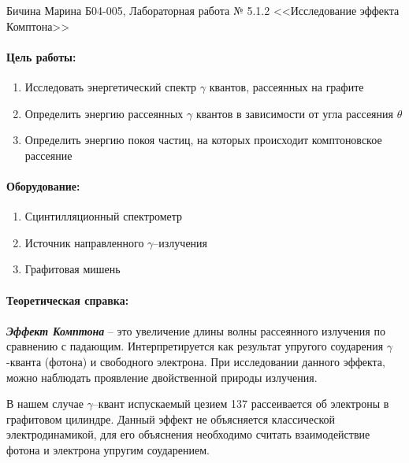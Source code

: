 \documentclass[a4paper,12pt]{article}
\author{Бичина Марина 
группа Б04-005 1 курса ФЭФМ}
\title{}
\date{}
\begin{document}

\begin{center}
\begin{Large}
{Бичина Марина Б04-005, Лабораторная работа № 5.1.2 <<Исследование эффекта Комптона>>}
\end{Large}
\end{center}
\paragraph{Цель работы:} 
\begin{enumerate}
\itemsep0em
\item Исследовать энергетический спектр $\gamma$ квантов, рассеянных на графите
\item Определить энергию рассеянных $\gamma$ квантов в зависимости от угла рассеяния $\theta$
\item Определить энергию покоя частиц, на которых происходит комптоновское рассеяние
\end{enumerate}
\paragraph{Оборудование:}
\begin{enumerate}
\itemsep0em
\item Сцинтилляционный спектрометр
\item Источник направленного $\gamma$--излучения
\item Графитовая мишень
\end{enumerate}


\paragraph{Теоретическая справка:}
\paragraph{}
\textbf{\textit{Эффект Комптона}} -- это увеличение длины волны рассеянного излучения по сравнению с падающим. Интерпретируется как результат упругого соударения $\gamma$-кванта (фотона) и свободного электрона. При исследовании данного эффекта, можно наблюдать проявление двойственной природы излучения. 

 В нашем случае $\gamma$--квант испускаемый цезием 137 рассеивается об электроны в графитовом цилиндре. Данный эффект не объясняется классической электродинамикой, для его объяснения необходимо считать взаимодействие фотона и электрона упругим соударением.
\end{document}
